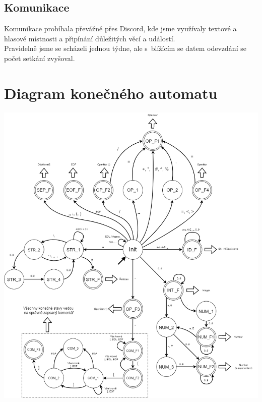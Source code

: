 \documentclass[11pt]{article}
\begin{document}
    \subsection{Komunikace}
        Komunikace probíhala převážně přes Discord, kde jsme využívaly textové a hlasové místnosti a připínání důležitých věcí a událostí. \\
    	\indent Pravidelně jsme se scházeli jednou týdne, ale s~blížícím se datem odevzdání se počet setkání zvyšoval. 
    	
	
    
    
    \section{Diagram konečného automatu}
        \vspace{9mm}
        \includegraphics[width=1\linewidth]{FSM.png}
        \pagebreak
    
    
\end{document}
